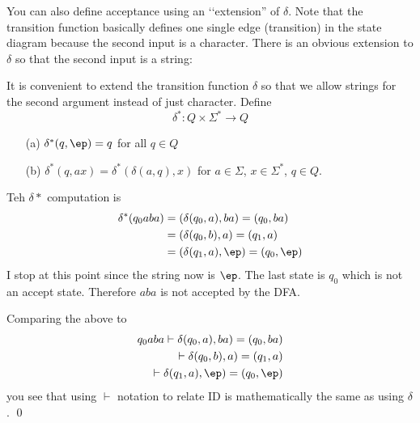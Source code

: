 \newpage
You can also define acceptance using an \lq\lq extension'' of $\delta$.
Note that the transition function basically defines one single
edge (transition) in the state diagram because the second input is a
character.
There is an obvious extension to $\delta$ so that the second
input is a string:

\begin{defn}
It is convenient to extend the transition function $\delta$ so that
we allow strings for the second argument instead of just character.
Define
\[
 \delta^* : Q \times \Sigma^* \rightarrow Q
\]
\begin{itemize}
 \item[(a)] $\delta^*(q, \ep) = q$ for all $q \in Q$
 \item[(b)] $\delta^*(q, ax) = \delta^*( \delta(a,q), x)$ for $a \in
 \Sigma$, $x \in \Sigma^*$, $q \in Q$.
\end{itemize}
\end{defn}



  \SOLUTION
  Teh $\delta*$ computation is
  \begin{align*}
    \delta^*(q_0 aba)
    &= (\delta(q_0, a), ba) = (q_0, ba) \\
    &= (\delta(q_0, b), a) = (q_1, a) \\
    &= (\delta(q_1, a), \ep) = (q_0, \ep)
  \end{align*}
  I stop at this point since the string now is $\ep$.
  The last state is $q_0$ which is not an accept state.
  Therefore
  $aba$ is not accepted by the DFA.

  Comparing the above to
    \begin{align*}
    q_0 aba
    \vdash \delta(q_0, a), ba) = (q_0, ba) \\ 
    \vdash \delta(q_0, b), a) = (q_1, a) \\
    \vdash \delta(q_1, a), \ep) = (q_0, \ep)
  \end{align*}
    you see that using $\vdash$ notation to relate
    ID is mathematically the same as
    using $\delta$.
    \qed
  
